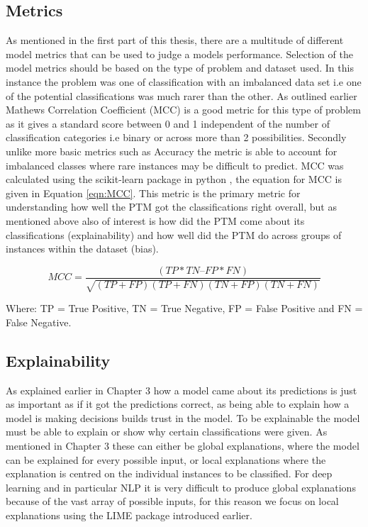 \subsection{Metrics} As mentioned in the first part of this thesis, there are a multitude of different model metrics that can be used to judge a models performance. Selection of the model metrics should be based on the type of problem and dataset used. In this instance the problem was one of classification with an imbalanced data set i.e one of the potential classifications was much rarer than the other. As outlined earlier Mathews Correlation Coefficient (MCC) is a good metric for this type of problem as it gives a standard score between 0 and 1 independent of the number of classification categories i.e binary or across more than 2 possibilities. Secondly unlike more basic metrics such as Accuracy the metric is able to account for imbalanced classes where rare instances may be difficult to predict. MCC was calculated using the scikit-learn package in python \parencite{scikit-learn}, the equation for MCC is given in Equation \ref{eqn:MCC}. This metric is the primary metric for understanding how well the PTM got the classifications right overall, but as mentioned above also of interest is how did the PTM come about its classifications (explainability) and how well did the PTM do across groups of instances within the dataset (bias). 

\begin{equation}
MCC =  \frac{(TP*TN – FP*FN)}{\sqrt{(TP+FP)(TP+FN)(TN+FP)(TN+FN)}}
\label{eqn:MCC}
\end{equation}

Where: TP = True Positive, TN = True Negative, FP = False Positive and FN = False Negative.


\subsection{Explainability}As explained earlier in Chapter 3 how a model came about its predictions is just as important as if it got the predictions correct, as being able to explain how a model is making decisions builds trust in the model. To be explainable the model must be able to explain or show why certain classifications were given. As mentioned in Chapter 3 these can either be global explanations, where the model can be explained for every possible input, or local explanations where the explanation is centred on the individual instances to be classified. For deep learning and in particular NLP it is very difficult to produce global explanations because of the vast array of possible inputs, for this reason we focus on local explanations using the LIME package introduced earlier. 

